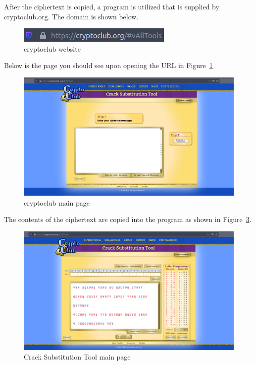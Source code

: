 \documentclass[12pt]{article}
\begin{document}
After the ciphertext is copied, a program is utilized that is supplied by cryptoclub.org. The domain is shown below.

\begin{figure}[!ht]
    \begin{center}
        \includegraphics[scale=0.65]{c0.1.png}
    \end{center}{}
    \caption{cryptoclub website}
    \label{fig:c0.1}
\end{figure}

\clearpage

Below is the page you should see upon opening the URL in Figure~\ref{fig:c0.1}

\begin{figure}[!ht]
    \begin{center}
        \includegraphics[scale=0.3]{c1.png}
    \end{center}{}
    \caption{cryptoclub main page}
    \label{fig:c1}
\end{figure}


The contents of the ciphertext are copied into the program as shown in Figure~\ref{fig:c3}.





\begin{figure}[!ht]
    \begin{center}
        \includegraphics[scale=0.3]{c3.png}
    \end{center}{}
    \caption{Crack Substitution Tool main page}
    \label{fig:c3}
\end{figure}
\end{document}
